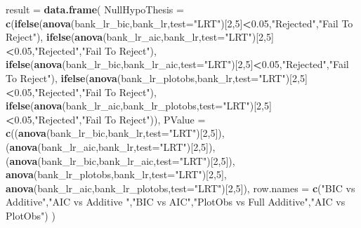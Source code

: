 \documentclass[
]{article}
\newenvironment{Shaded}{\begin{snugshade}}{\end{snugshade}}
\newcommand{\DataTypeTok}[1]{\textcolor[rgb]{0.13,0.29,0.53}{#1}}
\newcommand{\DecValTok}[1]{\textcolor[rgb]{0.00,0.00,0.81}{#1}}
\newcommand{\FloatTok}[1]{\textcolor[rgb]{0.00,0.00,0.81}{#1}}
\newcommand{\KeywordTok}[1]{\textcolor[rgb]{0.13,0.29,0.53}{\textbf{#1}}}
\newcommand{\NormalTok}[1]{#1}
\newcommand{\OperatorTok}[1]{\textcolor[rgb]{0.81,0.36,0.00}{\textbf{#1}}}
\newcommand{\StringTok}[1]{\textcolor[rgb]{0.31,0.60,0.02}{#1}}
\begin{document}
\begin{Shaded}
\begin{Highlighting}[]
\NormalTok{result =}\StringTok{ }\KeywordTok{data.frame}\NormalTok{(}
        \DataTypeTok{NullHypoThesis =} \KeywordTok{c}\NormalTok{(}\KeywordTok{ifelse}\NormalTok{(}\KeywordTok{anova}\NormalTok{(bank_lr_bic,bank_lr,}\DataTypeTok{test=}\StringTok{"LRT"}\NormalTok{)[}\DecValTok{2}\NormalTok{,}\DecValTok{5}\NormalTok{]}\OperatorTok{<}\FloatTok{0.05}\NormalTok{,}\StringTok{"Rejected"}\NormalTok{,}\StringTok{"Fail To Reject"}\NormalTok{),}
           \KeywordTok{ifelse}\NormalTok{(}\KeywordTok{anova}\NormalTok{(bank_lr_aic,bank_lr,}\DataTypeTok{test=}\StringTok{"LRT"}\NormalTok{)[}\DecValTok{2}\NormalTok{,}\DecValTok{5}\NormalTok{]}\OperatorTok{<}\FloatTok{0.05}\NormalTok{,}\StringTok{"Rejected"}\NormalTok{,}\StringTok{"Fail To Reject"}\NormalTok{),}
           \KeywordTok{ifelse}\NormalTok{(}\KeywordTok{anova}\NormalTok{(bank_lr_bic,bank_lr_aic,}\DataTypeTok{test=}\StringTok{"LRT"}\NormalTok{)[}\DecValTok{2}\NormalTok{,}\DecValTok{5}\NormalTok{]}\OperatorTok{<}\FloatTok{0.05}\NormalTok{,}\StringTok{"Rejected"}\NormalTok{,}\StringTok{"Fail To Reject"}\NormalTok{),}
           \KeywordTok{ifelse}\NormalTok{(}\KeywordTok{anova}\NormalTok{(bank_lr_plotobs,bank_lr,}\DataTypeTok{test=}\StringTok{"LRT"}\NormalTok{)[}\DecValTok{2}\NormalTok{,}\DecValTok{5}\NormalTok{]}\OperatorTok{<}\FloatTok{0.05}\NormalTok{,}\StringTok{"Rejected"}\NormalTok{,}\StringTok{"Fail To Reject"}\NormalTok{),}
           \KeywordTok{ifelse}\NormalTok{(}\KeywordTok{anova}\NormalTok{(bank_lr_aic,bank_lr_plotobs,}\DataTypeTok{test=}\StringTok{"LRT"}\NormalTok{)[}\DecValTok{2}\NormalTok{,}\DecValTok{5}\NormalTok{]}\OperatorTok{<}\FloatTok{0.05}\NormalTok{,}\StringTok{"Rejected"}\NormalTok{,}\StringTok{"Fail To Reject"}\NormalTok{)),}
          \DataTypeTok{PValue =} \KeywordTok{c}\NormalTok{((}\KeywordTok{anova}\NormalTok{(bank_lr_bic,bank_lr,}\DataTypeTok{test=}\StringTok{"LRT"}\NormalTok{)[}\DecValTok{2}\NormalTok{,}\DecValTok{5}\NormalTok{]),}
\NormalTok{           (}\KeywordTok{anova}\NormalTok{(bank_lr_aic,bank_lr,}\DataTypeTok{test=}\StringTok{"LRT"}\NormalTok{)[}\DecValTok{2}\NormalTok{,}\DecValTok{5}\NormalTok{]),}
\NormalTok{           (}\KeywordTok{anova}\NormalTok{(bank_lr_bic,bank_lr_aic,}\DataTypeTok{test=}\StringTok{"LRT"}\NormalTok{)[}\DecValTok{2}\NormalTok{,}\DecValTok{5}\NormalTok{]),}
           \KeywordTok{anova}\NormalTok{(bank_lr_plotobs,bank_lr,}\DataTypeTok{test=}\StringTok{"LRT"}\NormalTok{)[}\DecValTok{2}\NormalTok{,}\DecValTok{5}\NormalTok{],}
           \KeywordTok{anova}\NormalTok{(bank_lr_aic,bank_lr_plotobs,}\DataTypeTok{test=}\StringTok{"LRT"}\NormalTok{)[}\DecValTok{2}\NormalTok{,}\DecValTok{5}\NormalTok{]),}
\DataTypeTok{row.names =} \KeywordTok{c}\NormalTok{(}\StringTok{"BIC vs Additive"}\NormalTok{,}\StringTok{"AIC vs Additive "}\NormalTok{,}\StringTok{"BIC vs AIC"}\NormalTok{,}\StringTok{"PlotObs vs Full Additive"}\NormalTok{,}\StringTok{"AIC vs PlotObs"}\NormalTok{)}
\NormalTok{)}


\end{Highlighting}
\end{Shaded}
\end{document}
